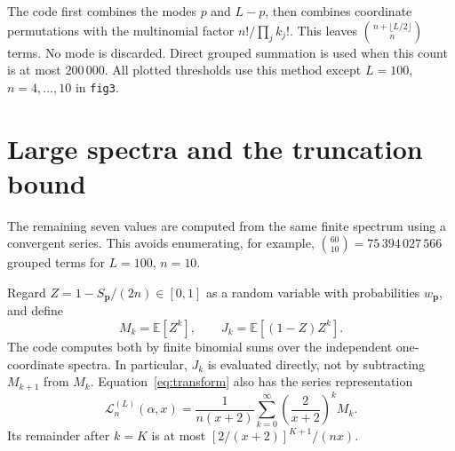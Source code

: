 \documentclass[10pt,a4paper]{article}
\newcommand{\Lap}{\mathcal L_n^{(L)}}
\begin{document}
The code first combines the modes $p$ and $L-p$, then combines coordinate
permutations with the multinomial factor $n!/\prod_j k_j!$.
This leaves $\binom{n+\lfloor L/2\rfloor}{n}$ terms. No mode is discarded.
Direct grouped summation is used when this count is at most $200\,000$.
All plotted thresholds use this method except $L=100$, $n=4,\ldots,10$
in \texttt{fig3}.

\newpage
\section*{Large spectra and the truncation bound}
The remaining seven values are computed from the same finite spectrum using
a convergent series. This avoids enumerating, for example,
$\binom{60}{10}=75\,394\,027\,566$ grouped terms for $L=100$, $n=10$.

Regard $Z=1-S_{\mathbf p}/(2n)\in[0,1]$ as a random variable with
probabilities $w_{\mathbf p}$, and define
\begin{equation*}
 M_k=\mathbb E[Z^k],\qquad J_k=\mathbb E[(1-Z)Z^k].
\end{equation*}
The code computes both by finite binomial sums over the independent
one-coordinate spectra. In particular, $J_k$ is evaluated directly,
not by subtracting $M_{k+1}$ from $M_k$.
Equation~\eqref{eq:transform} also has the series representation
\begin{equation*}
 \Lap(\alpha,x)=\frac{1}{n(x+2)}\sum_{k=0}^{\infty}
 \left(\frac{2}{x+2}\right)^k M_k.
\end{equation*}
Its remainder after $k=K$ is at most $[2/(x+2)]^{K+1}/(nx)$.
\end{document}
